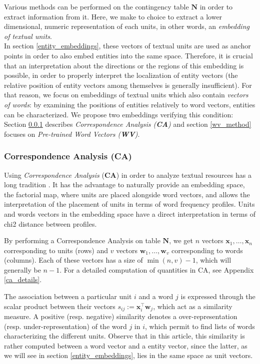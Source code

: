 \documentclass[
twocolumn,
]{ceurart}
\begin{document}
Various methods can be performed on the contingency table $\mathbf{N}$ in order to extract information from it. Here, we make to choice to extract a lower dimensional, numeric representation of each units, in other words, an \emph{embedding of textual units}. \\
In section \ref{entity_embeddings}, these vectors of textual units are used as anchor points in order to also embed entities into the same space. Therefore, it is crucial that an interpretation about the directions or the regions of this embedding is possible, in order to properly interpret the localization of entity vectors (the relative position of entity vectors among themselves is generally insufficient). For that reason, we focus on embeddings of textual units which also contain \emph{vectors of words}: by examining the positions of entities relatively to word vectors, entities can be characterized. We propose two embeddings verifying this condition: Section \ref{ca_method} describes \emph{Correspondence Analysis (\textbf{CA})} and section \ref{wv_method} focuses on \emph{Pre-trained Word Vectors (\textbf{WV})}. 

\subsubsection{Correspondence Analysis (CA)}
\label{ca_method}

Using \emph{Correspondence Analysis} (\textbf{CA}) in order to analyze textual resources has a long tradition \cite{Lebart2019}. It has the advantage to naturally provide an embedding space, the factorial map, where units are placed alongside word vectors, and allows the interpretation of the placement of units in terms of word frequency profiles. Units and words vectors in the embedding space have a direct interpretation in terms of chi2 distance between profiles.

By performing a Correspondence Analysis on table $\mathbf{N}$, we get $n$ vectors $\mathbf{x}_1, \ldots, \mathbf{x}_n$ corresponding to units (rows) and $v$ vectors $\mathbf{w}_1, \ldots, \mathbf{w}_v$ corresponding to words (columns). Each of these vectors has a size of $\min(n, v) - 1$, which will generally be $n - 1$. For a detailed computation of quantities in CA, see Appendix \ref{ca_details}. 

The association between a particular unit $i$ and a word $j$ is expressed through the scalar product between their vectors $s_{ij} := \mathbf{x}^\top_i \mathbf{w}_j$, which act as a similarity measure. A positive (resp. negative) similarity denotes a over-representation (resp. under-representation) of the word $j$ in $i$, which permit to find lists of words characterizing the different units. Observe that in this article, this similarity is rather computed between a word vector and a entity vector, since the latter, as we will see in section \ref{entity_embeddings}, lies in the same space as unit vectors. 
\end{document}

